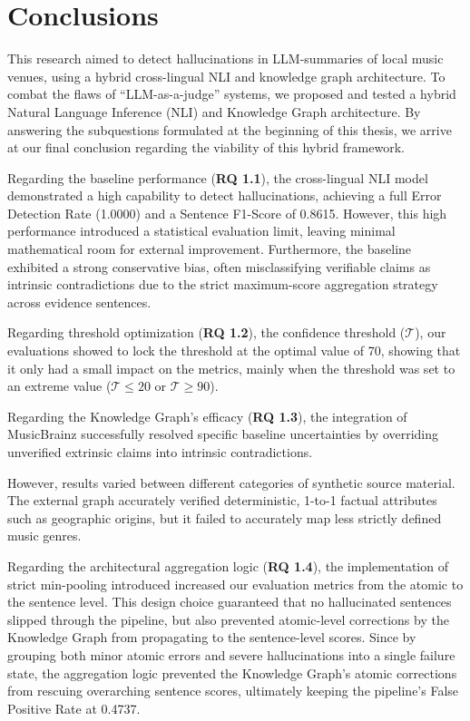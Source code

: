 \chapter{Conclusions}\label{conclusions}

This research aimed to detect hallucinations in LLM-summaries of local music venues, using a hybrid cross-lingual NLI and knowledge graph architecture. To combat the flaws of ``LLM-as-a-judge'' systems, we proposed and tested a hybrid Natural Language Inference (NLI) and Knowledge Graph architecture. By answering the subquestions formulated at the beginning of this thesis, we arrive at our final conclusion regarding the viability of this hybrid framework. 

Regarding the baseline performance (\textbf{RQ 1.1}), the cross-lingual NLI model demonstrated a high capability to detect hallucinations, achieving a full Error Detection Rate (1.0000) and a Sentence F1-Score of 0.8615. However, this high performance introduced a statistical evaluation limit, leaving minimal mathematical room for external improvement. Furthermore, the baseline exhibited a strong conservative bias, often misclassifying verifiable claims as intrinsic contradictions due to the strict maximum-score aggregation strategy across evidence sentences.

Regarding threshold optimization (\textbf{RQ 1.2}), the confidence threshold ($\mathcal{T}$), our evaluations showed to lock the threshold at the optimal value of 70, showing that it only had a small impact on the metrics, mainly when the threshold was set to an extreme value ($\mathcal{T} \le 20$ or $\mathcal{T} \ge 90$). 

Regarding the Knowledge Graph's efficacy (\textbf{RQ 1.3}), the integration of MusicBrainz successfully resolved specific baseline uncertainties by overriding unverified extrinsic claims into intrinsic contradictions. 

However, results varied between different categories of synthetic source material. The external graph accurately verified deterministic, 1-to-1 factual attributes such as geographic origins, but it failed to accurately map less strictly defined music genres. 

Regarding the architectural aggregation logic (\textbf{RQ 1.4}), the implementation of strict min-pooling introduced increased our evaluation metrics from the atomic to the sentence level. This design choice guaranteed that no hallucinated sentences slipped through the pipeline, but also prevented atomic-level corrections by the Knowledge Graph from propagating to the sentence-level scores. Since by grouping both minor atomic errors and severe hallucinations into a single failure state, the aggregation logic prevented the Knowledge Graph's atomic corrections from rescuing overarching sentence scores, ultimately keeping the pipeline's False Positive Rate at 0.4737.

